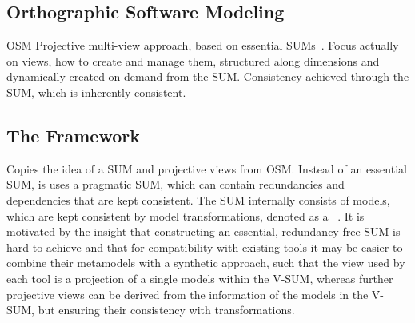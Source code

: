 




\subsection{Orthographic Software Modeling}
\label{chap:foundations:multiview:osm}

\gls{OSM}
Projective multi-view approach, based on essential SUMs~\cite{atkinson2010a}.
Focus actually on views, how to create and manage them, structured along dimensions and dynamically created on-demand from the SUM.
Consistency achieved through the SUM, which is inherently consistent.


\subsection{The \vitruv Framework}
\label{chap:foundations:multiview:vitruv}
Copies the idea of a SUM and projective views from \gls{OSM}.
Instead of an essential SUM, is uses a pragmatic SUM, which can contain redundancies and dependencies that are kept consistent.
The SUM internally consists of models, which are kept consistent by model transformations, denoted as a \vsum~\cite{klare2020Vitruv-JSS}.
It is motivated by the insight that constructing an essential, redundancy-free SUM is hard to achieve and that for compatibility with existing tools it may be easier to combine their metamodels with a synthetic approach, such that the view used by each tool is a projection of a single models within the V-SUM, whereas further projective views can be derived from the information of the models in the V-SUM, but ensuring their consistency with transformations.

